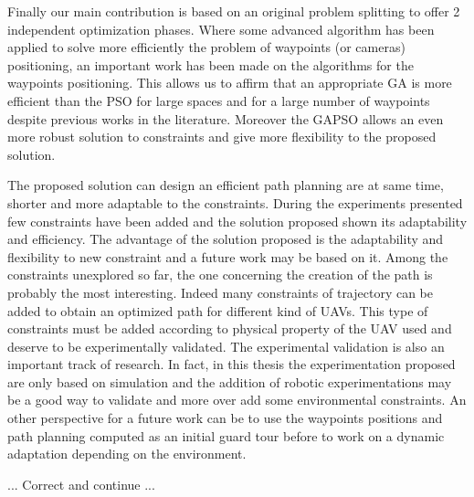 Finally  our main contribution is based on an original problem splitting to offer 2 independent optimization phases. Where some advanced algorithm has been applied to solve more efficiently the problem of waypoints (or cameras) positioning, an important work has been made on the algorithms for the waypoints positioning. This allows us to affirm that an appropriate GA is more efficient than the PSO for large spaces and for a large number of waypoints despite previous works in the literature. Moreover the GAPSO allows an even more robust solution to constraints and give more flexibility to the proposed solution. 

The proposed solution can design an efficient path planning are at same time, shorter and more adaptable to the constraints. During the experiments presented few constraints have been added and the solution proposed shown its adaptability and efficiency. 
The advantage of the solution proposed is the adaptability and flexibility to new constraint and  a future work may be based on it. %
Among the constraints unexplored so far, the one concerning the creation of the path is probably the most interesting.  Indeed many constraints of trajectory can be added to obtain an optimized path for different kind of UAVs. This type of constraints must be added according to physical property of the UAV used and deserve to be experimentally validated. 
The experimental validation is also an important track of research. In fact, in this thesis the experimentation proposed are only based on simulation and the addition of robotic experimentations may be a good way to validate and more over add some environmental constraints.  
An other perspective for a future work can be to use the waypoints positions and path planning computed as an initial guard tour before to work on a dynamic adaptation depending on the environment.



... Correct and continue ...

